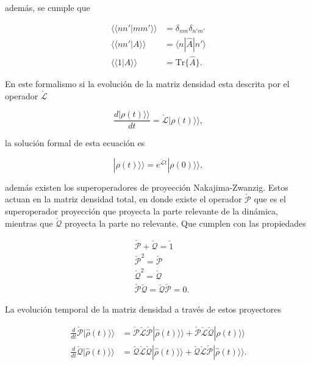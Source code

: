 además, se cumple que 

\begin{align*}
    \langle \langle nn'|mm'\rangle \rangle & = \delta_{nm}\delta_{n'm'}\\
    \langle \langle nn'|A\rangle \rangle & = \langle n|\hat{A}|n'\rangle \\
    \langle \langle 1|A\rangle \rangle & = \text{Tr}\{\hat{A}\}.
\end{align*}

En este formalismo si la evolución de la matriz densidad esta descrita por el operador $\check{\mathcal{L}}$

\begin{equation*}
    \frac{d|\rho(t) \rangle \rangle}{dt} = \check{\mathcal{L}}|\rho(t) \rangle \rangle,
\end{equation*}

la solución formal de esta ecuación es 

\begin{equation}
    |\rho(t)\rangle \rangle = e^{\check{\mathcal{L}}t}|\rho(0)\rangle \rangle, 
    \label{sec2liouvilleformal}
\end{equation}

además existen los superoperadores de proyección Nakajima-Zwanzig\cite{zwanzig1966statistical}. Estos actuan en la matriz densidad total, en donde existe el operador  $\check{\mathcal{P}}$ que es el superoperador proyección que proyecta la parte relevante de la dinámica, mientras que $\check{\mathcal{Q}}$ proyecta la parte no relevante. Que cumplen con las propiedades

\begin{align*}
    & \check{\mathcal{P}} + \check{\mathcal{Q}} = \check{1} \\
    & \check{\mathcal{P}}^{2} = \check{\mathcal{P}} \\
    & \check{\mathcal{Q}}^{2} = \check{\mathcal{Q}} \\
    & \check{\mathcal{P}}\check{\mathcal{Q}} = \check{\mathcal{Q}}\check{\mathcal{P}} = 0.
\end{align*}    

La evolución temporal de la matriz densidad a través de estos proyectores

\begin{align*}
    \frac{d}{dt}\check{\mathcal{P}}|\hat{\rho}(t)\rangle \rangle & = \check{\mathcal{P}}\check{\mathcal{L}}\check{\mathcal{P}}|\hat{\rho}(t)\rangle \rangle  + \check{\mathcal{P}}\check{\mathcal{L}}\check{\mathcal{Q}}|\hat{\rho}(t)\rangle \rangle \\
    \frac{d}{dt}\check{\mathcal{Q}}|\hat{\rho}(t)\rangle \rangle  & = \check{\mathcal{Q}}\check{\mathcal{L}}\check{\mathcal{Q}}|\hat{\rho}(t)\rangle \rangle  + \check{\mathcal{Q}}\check{\mathcal{L}}\check{\mathcal{P}}|\hat{\rho}(t)\rangle \rangle.
\end{align*}

